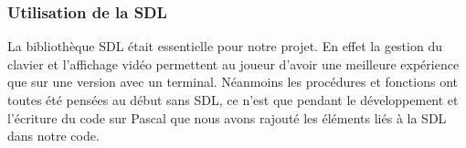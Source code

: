         \subsubsection{Utilisation de la SDL}
        La bibliothèque SDL était essentielle pour notre projet. En effet la gestion du clavier et l'affichage vidéo permettent au joueur d'avoir une meilleure expérience que sur une version avec un terminal. Néanmoins les procédures et fonctions ont toutes été pensées au début sans SDL, ce n'est que pendant le développement et l'écriture du code sur Pascal que nous avons rajouté les éléments liés à la SDL dans notre code. 
        
 
